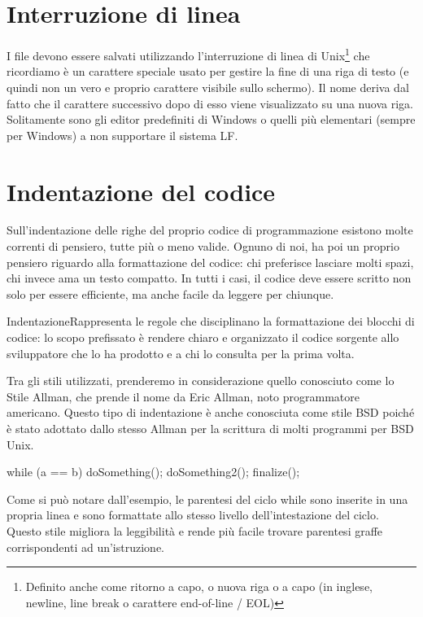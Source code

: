 \section{Interruzione di linea}
I file devono essere salvati utilizzando l'interruzione di linea di Unix\footnote{Definito anche come ritorno a capo, o nuova riga o a capo (in inglese, newline, line break o carattere end-of-line / EOL)} che ricordiamo  è un carattere speciale usato per gestire la fine di una riga di testo (e quindi non un vero e proprio carattere visibile sullo schermo). Il nome deriva dal fatto che il carattere successivo dopo di esso viene visualizzato su una nuova riga.
Solitamente sono gli editor predefiniti di Windows o quelli più elementari (sempre per Windows) a non supportare il sistema LF.

\section{Indentazione del codice}
Sull'indentazione delle righe del proprio codice di programmazione esistono molte correnti di pensiero, tutte più o meno valide. Ognuno di noi, ha poi un proprio pensiero riguardo alla formattazione del codice: chi preferisce lasciare molti spazi, chi invece ama un testo compatto. In tutti i casi, il codice deve essere scritto non solo per essere efficiente, ma anche facile da leggere per chiunque.

\begin{deftab}{Indentazione}{Rappresenta le regole che disciplinano la formattazione dei blocchi di codice: lo scopo prefissato è rendere chiaro e organizzato il codice sorgente allo sviluppatore che lo ha prodotto e a chi lo consulta per la prima volta.}
\end{deftab}

Tra gli stili utilizzati, prenderemo in considerazione quello conosciuto come lo Stile Allman, che prende il nome da Eric Allman, noto programmatore americano. Questo tipo di indentazione è anche conosciuta come stile BSD poiché è stato adottato dallo stesso Allman per la scrittura di molti programmi per BSD Unix.

\begin{code}
while (a == b)
  {
      doSomething();
      doSomething2();
  }
  finalize();
\end{code}

Come si può notare dall'esempio, le parentesi del ciclo while sono inserite in una propria linea e sono formattate allo stesso livello dell'intestazione del ciclo. Questo stile migliora la leggibilità e rende più facile trovare parentesi graffe corrispondenti ad un'istruzione.

